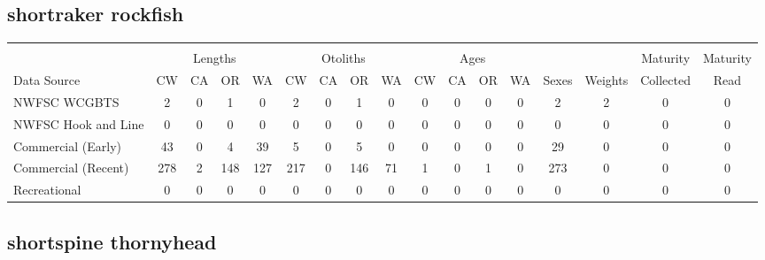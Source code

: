 \documentclass[12pt,]{article}
\begin{document}
\FloatBarrier  

\subsection{shortraker rockfish}\label{shortraker-rockfish}

\begin{table}[ht]
\centering
\begingroup\fontsize{10pt}{10pt}\selectfont
\begin{tabular}{|l|cccc|cccc|cccc|c|c|c|c|}
  \hline
 &  &  &  &  &  &  &  &  &  &  &  &  &  &  &  &  \\ 
   & \multicolumn{4}{c}{Lengths} &  \multicolumn{4}{c}{Otoliths} & \multicolumn{4}{c}{Ages} &  & & Maturity & Maturity\\
 Data Source & CW & CA & OR & WA & CW & CA & OR & WA & CW & CA & OR & WA & Sexes & Weights & Collected & Read\\
 \hline
NWFSC WCGBTS & 2 & 0 & 1 & 0 & 2 & 0 & 1 & 0 & 0 & 0 & 0 & 0 & 2 & 2 & 0 & 0 \\ 
  NWFSC Hook and Line & 0 & 0 & 0 & 0 & 0 & 0 & 0 & 0 & 0 & 0 & 0 & 0 & 0 & 0 & 0 & 0 \\ 
  Commercial (Early) & 43 & 0 & 4 & 39 & 5 & 0 & 5 & 0 & 0 & 0 & 0 & 0 & 29 & 0 & 0 & 0 \\ 
  Commercial (Recent) & 278 & 2 & 148 & 127 & 217 & 0 & 146 & 71 & 1 & 0 & 1 & 0 & 273 & 0 & 0 & 0 \\ 
  Recreational & 0 & 0 & 0 & 0 & 0 & 0 & 0 & 0 & 0 & 0 & 0 & 0 & 0 & 0 & 0 & 0 \\ 
   \hline
\end{tabular}
\endgroup
\end{table}

\FloatBarrier  

\subsection{shortspine thornyhead}\label{shortspine-thornyhead}
\end{document}
